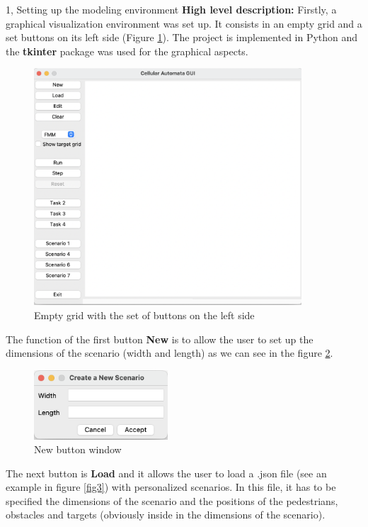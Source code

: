 \documentclass[10pt,a4paper]{article}
\begin{document}
\frontpage

\begin{task}{1, Setting up the modeling environment}
\noindent\textbf{High level description:} Firstly, a graphical visualization environment was set up. It consists in an empty grid and a set buttons on its left side (Figure \ref{fig1}). The project is implemented in Python and the \textbf{tkinter} package was used for the graphical aspects.

\begin{figure}[h]
    \includegraphics[width=10cm]{menu}
    \centering
    \caption{Empty grid with the set of buttons on the left side}
    \label{fig1}
\end{figure}

The function of the first button \textbf{New} is to allow the user to set up the dimensions of the scenario (width and length) as we can see in the figure \ref{fig2}.
\begin{figure}[h]
    \includegraphics[width=5cm]{new}
    \centering
    \caption{New button window}
    \label{fig2}
\end{figure}

The next button is \textbf{Load} and it allows the user to load a .json file (see an example in figure \ref{fig3}) with personalized scenarios. In this file, it has to be specified the dimensions of the scenario and the positions of the pedestrians, obstacles and targets (obviously inside in the dimensions of the scenario).


\end{task}
\end{document}

